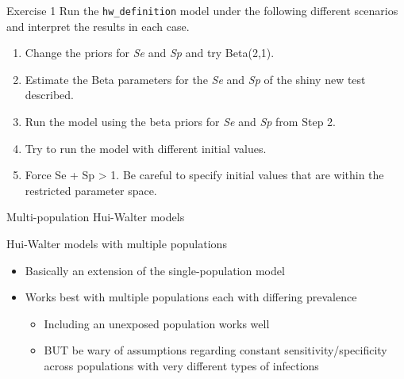 \documentclass[
  ignorenonframetext,
]{beamer}
\providecommand{\tightlist}{%
  \setlength{\itemsep}{0pt}\setlength{\parskip}{0pt}}
\begin{document}
\begin{frame}[fragile]
\begin{block}{Exercise 1}
\protect\hypertarget{exercise-1}{}
Run the \texttt{hw\_definition} model under the following different
scenarios and interpret the results in each case.

\begin{enumerate}
\item
  Change the priors for \emph{Se} and \emph{Sp} and try Beta(2,1).
\item
  Estimate the Beta parameters for the \emph{Se} and \emph{Sp} of the
  shiny new test described.
\item
  Run the model using the beta priors for \emph{Se} and \emph{Sp} from
  Step 2.
\item
  Try to run the model with different initial values.
\item
  Force Se + Sp \textgreater{} 1. Be careful to specify initial values
  that are within the restricted parameter space.
\end{enumerate}
\end{block}
\end{frame}

\begin{frame}{Multi-population Hui-Walter models}
\protect\hypertarget{multi-population-hui-walter-models}{}
\end{frame}

\begin{frame}
\begin{block}{Hui-Walter models with multiple populations}
\protect\hypertarget{hui-walter-models-with-multiple-populations}{}
\begin{itemize}
\item
  Basically an extension of the single-population model
\item
  Works best with multiple populations each with differing prevalence

  \begin{itemize}
  \tightlist
  \item
    Including an unexposed population works well
  \item
    BUT be wary of assumptions regarding constant
    sensitivity/specificity across populations with very different types
    of infections
  \end{itemize}
\end{itemize}
\end{block}
\end{frame}
\end{document}
